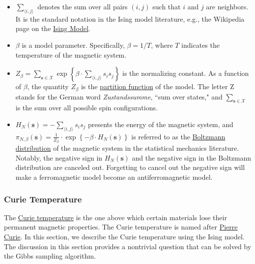 \documentclass[11pt,letterpaper, leqno]{article}
\numberwithin{equation}{section}
\numberwithin{theorem}{section}
\numberwithin{lemma}{section}
\numberwithin{corollary}{section}
\numberwithin{definition}{section}
\numberwithin{proposition}{section}
\numberwithin{remark}{section}
\numberwithin{example}{section}
\begin{document}
\begin{itemize}
\item $\sum_{\langle i,j\rangle}$ denotes the sum over all pairs $(i,j)$ such that $i$ and $j$ are neighbors.  It is the standard notation in the Ising model literature, e.g., the Wikipedia page on the \href{https://en.wikipedia.org/wiki/Ising_model}{Ising Model}. 
    
\item $\beta$ is a model parameter. Specifically, $\beta=1/T$, where $T$ indicates the temperature of the magnetic system.

\item $Z_\beta=\sum_{\boldsymbol{s}\in\mathcal{X}}\exp\left\{ \beta\cdot\sum_{\langle i,j\rangle}s_is_j\right\}$ is the normalizing constant. As a function of $\beta$, the quantity $Z_\beta$ is the \href{https://en.wikipedia.org/wiki/Partition_function_(statistical_mechanics)}{partition function} of the model. The letter Z stands for the German word \textit{Zustandssumme}, ``sum over states," and $\sum_{\boldsymbol{s}\in\mathcal{X}}$ is the sum over all possible spin configurations.

\item $H_N(\boldsymbol{s}) = - \sum_{\langle i,j\rangle} s_i s_j$ presents the energy of the magnetic system, and $\pi_{N,\beta}(\boldsymbol{s}) =\frac{1}{Z_\beta}\cdot\exp\left\{ - \beta\cdot H_N(\boldsymbol{s}) \right\}$ is referred to as the \href{https://en.wikipedia.org/wiki/Boltzmann_distribution}{Boltzmann distribution} of the magnetic system in the statistical mechanics literature. Notably, the negative sign in $H_N(\boldsymbol{s})$ and the negative sign in the Boltzmann distribution are canceled out. Forgetting to cancel out the negative sign will make a ferromagnetic model become an antiferromagnetic model.
\end{itemize}

\subsubsection{Curie Temperature}\label{Curie Temperature}


The \href{https://en.wikipedia.org/wiki/Curie_temperature}{Curie temperature} is the one above which certain materials lose their permanent magnetic properties. The Curie temperature is named after \href{https://en.wikipedia.org/wiki/Pierre_Curie}{Pierre Curie}. In this section, we describe the Curie temperature using the Ising model. The discussion in this section provides a nontrivial question that can be solved by the Gibbs sampling algorithm.
\end{document}
